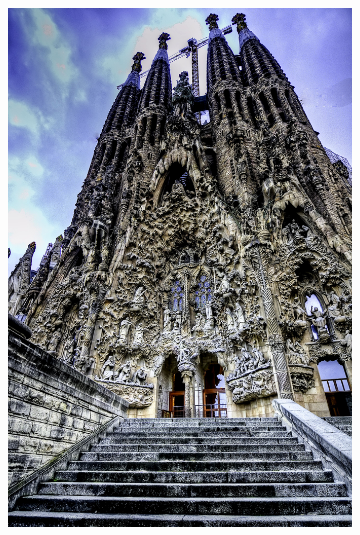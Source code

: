 \documentclass{beamer}
\begin{document}
\begin{frame}
\begin{figure}[t]
    \begin{subfigure}[b]{.3\textwidth}
      \includegraphics[width=.9\textwidth]{images/sagrada-familia.jpg}
    \end{subfigure}
    \pause
    \begin{subfigure}[b]{.3\textwidth}

\end{subfigure}
\end{figure}
\end{frame}
\end{document}
